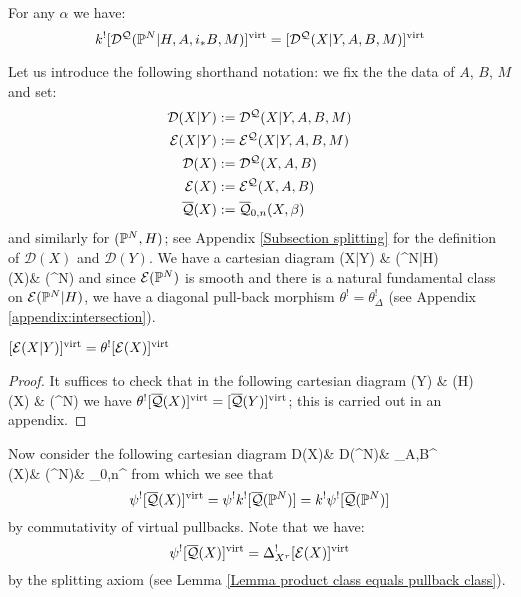 \begin{lem} \label{Comb loci pull back} For any $\alpha$ we have:
\begin{equation*} k^! [\mathcal D^\mathcal{Q}(\mathbb P^N|H,A,i_*B,M)]^{\operatorname{virt}} = [\mathcal D^\mathcal{Q}(X|Y,A,B,M)]^{\operatorname{virt}} \end{equation*} \end{lem}
Let us introduce the following shorthand notation: we fix the the data of $A$, $B$, $M$ and set:
\begin{align*}
\mathcal{D}(X|Y) & := \mathcal D^{\mathcal{Q}}(X|Y,A,B,M) \\
\mathcal{E}(X|Y) & := \mathcal E^{\mathcal{Q}}(X|Y,A,B,M) \\
\mathcal{D}(X) & := \mathcal{D}^{\mathcal{Q}}(X,A,B) \\
\mathcal{E}(X) & := \mathcal{E}^{\mathcal{Q}}(X,A,B) \\
\overline{\mathcal{Q}}(X) & :=\overline{\mathcal Q}_{0,n}(X,\beta)
\end{align*}
and similarly for $(\mathbb P^N,H)$; see Appendix \ref{Subsection splitting} for the definition of $\mathcal{D}(X)$ and $\mathcal{D}(Y)$. We have a cartesian diagram
\bcd
{}(X|Y) \ar[d]\ar[r] & (\PP^N|H)\ar[d,"\theta"] \\
(X)\ar[r] & (\PP^N)
\ecd
and since $\mathcal{E}(\mathbb P^N)$ is smooth and there is a natural fundamental class on $\mathcal{E}(\mathbb P^N|H)$, we have a diagonal pull-back morphism $\theta^! = \theta_{\Delta}^!$ (see Appendix \ref{appendix:intersection}).
\begin{lemma}\label{theta-pull} $[\mathcal{E}(X|Y)]^{\operatorname{virt}}=\theta^![\mathcal{E}(X)]^{\operatorname{virt}}$ \end{lemma}
\begin{proof}
It suffices to check that in the following cartesian diagram
\bcd
{}(Y) \ar[r] \ar[d]  & (H) \ar[d,"\theta"] \\
(X) \ar[r] & (\PP^N)
\ecd
we have $\theta^! [\overline{\mathcal{Q}}(X)]^{\operatorname{virt}} = [\overline{\mathcal{Q}}(Y)]^{\operatorname{virt}}$; this is carried out in an appendix.
\end{proof}

Now consider the following cartesian diagram
\bcd
\mathcal D(X)\ar[r]\ar[d,"\varphi_X"] & \mathcal D(\PP^N)\ar[r]\ar[d,"\varphi_{\PP^N}"] & \MM_{A,B}^{}\ar[d,"\psi"] \\
(X)\ar[r,"k"] & (\PP^N)\ar[r] & \MM_{0,n}^{}
\ecd
from which we see that
\[
 \psi^![\overline{\mathcal{Q}}(X)]^{\operatorname{virt}}= \psi^! k^! [ \overline{\mathcal{Q}}(\mathbb P^N)] = k^!\psi^![\overline{\mathcal{Q}}(\mathbb P^N)]
\]
by commutativity of virtual pullbacks. Note that we have:
\begin{equation*} \psi^! [\overline{\mathcal{Q}}(X)]^{\operatorname{virt}} = \Delta_{X^r}^! [\mathcal{E}(X)]^{\operatorname{virt}} \end{equation*}
by the splitting axiom (see Lemma \ref{Lemma product class equals pullback class}).

